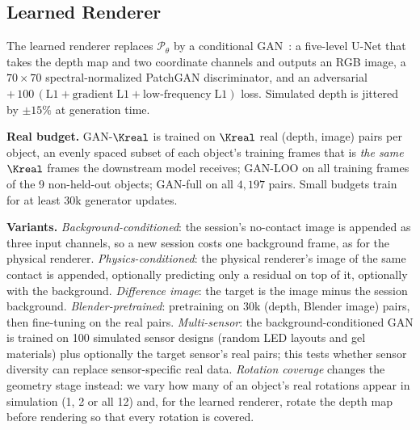 \subsection{Learned Renderer}
\label{sec:gan}
The learned renderer replaces $\mathcal{P}_\theta$ by a conditional GAN~\cite{isola2017pix2pix,church2022tactile}: a five-level U-Net that takes the depth map and two coordinate channels and outputs an RGB image, a $70\times70$ spectral-normalized PatchGAN discriminator, and an adversarial $+\,100\,(\mathrm{L1} + \mathrm{gradient\;L1} + \mathrm{low\text{-}frequency\;L1})$ loss. Simulated depth is jittered by $\pm15\%$ at generation time.

\noindent\textbf{Real budget.} GAN-$\Kreal$ is trained on $\Kreal$ real (depth, image) pairs per object, an evenly spaced subset of each object's training frames that is \emph{the same} $\Kreal$ frames the downstream model receives; GAN-LOO on all training frames of the 9 non-held-out objects; GAN-full on all $4{,}197$ pairs. Small budgets train for at least $30$k generator updates.

\noindent\textbf{Variants.} \emph{Background-conditioned}: the session's no-contact image is appended as three input channels, so a new session costs one background frame, as for the physical renderer. \emph{Physics-conditioned}: the physical renderer's image of the same contact is appended, optionally predicting only a residual on top of it, optionally with the background. \emph{Difference image}: the target is the image minus the session background. \emph{Blender-pretrained}: pretraining on $30$k (depth, Blender image) pairs, then fine-tuning on the real pairs. \emph{Multi-sensor}: the background-conditioned GAN is trained on 100 simulated sensor designs (random LED layouts and gel materials) plus optionally the target sensor's real pairs; this tests whether sensor diversity can replace sensor-specific real data. \emph{Rotation coverage} changes the geometry stage instead: we vary how many of an object's real rotations appear in simulation (1, 2 or all 12) and, for the learned renderer, rotate the depth map before rendering so that every rotation is covered.

